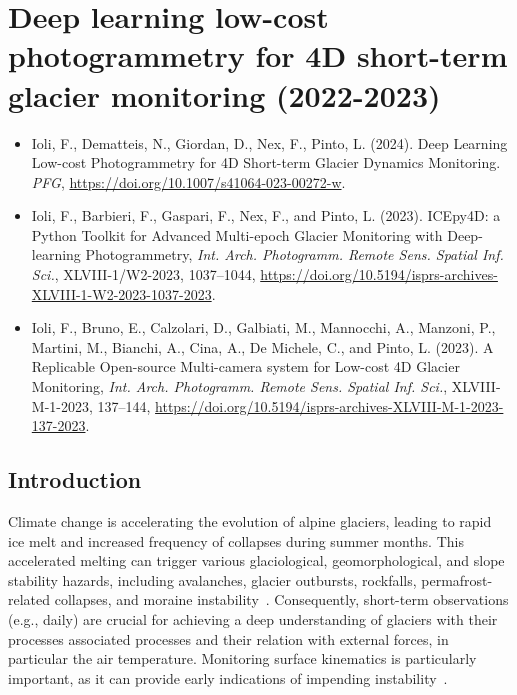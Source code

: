 \graphicspath{{figures/chapter4/}}
\onehalfspacing

\chapter{Deep learning low-cost photogrammetry for 4D short-term glacier monitoring
  (2022-2023)}



\begin{itemize}
  \item Ioli, F., Dematteis, N., Giordan, D., Nex, F., Pinto, L. (2024). Deep Learning Low-cost Photogrammetry for 4D Short-term Glacier Dynamics Monitoring. \textit{PFG}, \footnotesize{\url{https://doi.org/10.1007/s41064-023-00272-w}}.
  \item Ioli, F., Barbieri, F., Gaspari, F., Nex, F., and Pinto, L. (2023).
  ICEpy4D: a Python Toolkit for Advanced Multi-epoch Glacier Monitoring with Deep-learning Photogrammetry, \textit{Int. Arch. Photogramm. Remote Sens. Spatial Inf. Sci.}, XLVIII-1/W2-2023, 1037–1044, \footnotesize{\url{https://doi.org/10.5194/isprs-archives-XLVIII-1-W2-2023-1037-2023}}.
  \item Ioli, F., Bruno, E., Calzolari, D., Galbiati, M., Mannocchi, A., Manzoni, P., Martini, M., Bianchi, A., Cina, A., De Michele, C., and Pinto, L. (2023). A Replicable Open-source Multi-camera system for Low-cost 4D Glacier Monitoring, \textit{Int. Arch. Photogramm. Remote Sens. Spatial Inf. Sci.}, XLVIII-M-1-2023, 137–144, \footnotesize{\url{https://doi.org/10.5194/isprs-archives-XLVIII-M-1-2023-137-2023}}.
\end{itemize}

\newpage

\section{Introduction}\label{sec:4:intro}

Climate change is accelerating the evolution of alpine glaciers, leading to rapid ice melt and increased frequency of collapses during summer months. 
This accelerated melting can trigger various glaciological, geomorphological, and slope stability hazards, including avalanches, glacier outbursts, rockfalls, permafrost-related collapses, and moraine instability~\citep{Kaab2005, chiarle2023, Nigrelli2024}.
Consequently, short-term observations (e.g., daily) are crucial for achieving a deep understanding of glaciers with their processes associated processes and their relation with external forces, in particular the air temperature.
Monitoring surface kinematics is particularly important, as it can provide early indications of impending instability~\citep{Faillettaz2015}.


